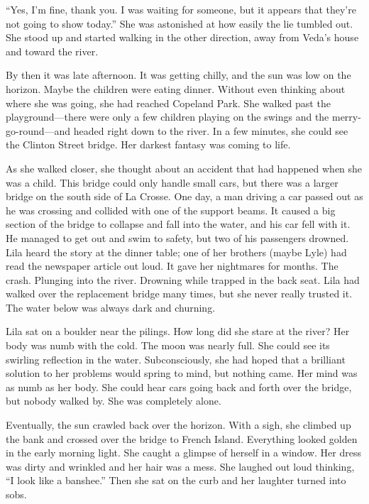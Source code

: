 \documentclass[
  american,
  letterpaper,
]{book}
\begin{document}
``Yes, I'm fine, thank you. I was waiting for someone, but it appears
that they're not going to show today.'' She was astonished at how easily
the lie tumbled out. She stood up and started walking in the other
direction, away from Veda's house and toward the river.

By then it was late afternoon. It was getting chilly, and the sun was
low on the horizon. Maybe the children were eating dinner. Without even
thinking about where she was going, she had reached Copeland Park. She
walked past the playground---there were only a few children playing on
the swings and the merry-go-round---and headed right down to the river.
In a few minutes, she could see the Clinton Street bridge. Her darkest
fantasy was coming to life.

As she walked closer, she thought about an accident that had happened
when she was a child. This bridge could only handle small cars, but
there was a larger bridge on the south side of La Crosse. One day, a man
driving a car passed out as he was crossing and collided with one of the
support beams. It caused a big section of the bridge to collapse and
fall into the water, and his car fell with it. He managed to get out and
swim to safety, but two of his passengers drowned. Lila heard the story
at the dinner table; one of her brothers (maybe Lyle) had read the
newspaper article out loud. It gave her nightmares for months. The
crash. Plunging into the river. Drowning while trapped in the back seat.
Lila had walked over the replacement bridge many times, but she never
really trusted it. The water below was always dark and churning.

Lila sat on a boulder near the pilings. How long did she stare at the
river? Her body was numb with the cold. The moon was nearly full. She
could see its swirling reflection in the water. Subconsciously, she had
hoped that a brilliant solution to her problems would spring to mind,
but nothing came. Her mind was as numb as her body. She could hear cars
going back and forth over the bridge, but nobody walked by. She was
completely alone.

Eventually, the sun crawled back over the horizon. With a sigh, she
climbed up the bank and crossed over the bridge to French Island.
Everything looked golden in the early morning light. She caught a
glimpse of herself in a window. Her dress was dirty and wrinkled and her
hair was a mess. She laughed out loud thinking, ``I look like a
banshee.'' Then she sat on the curb and her laughter turned into sobs.
\end{document}
